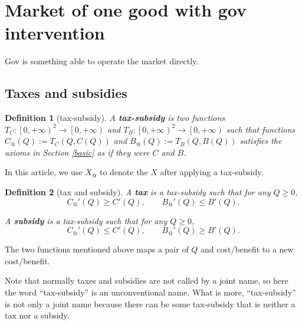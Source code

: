 \documentclass{article}
\newtheorem{definition}{Definition}[subsection]
\begin{document}
\section{Market of one good with gov intervention}

Gov is something able to operate the market directly.

\subsection{Taxes and subsidies}

\begin{definition}[tax-subsidy]
\label{tax-subsidy}
A \textbf{tax-subsidy} is two functions
$T_C:\left[0,+\infty\right)^2\to\left[0,+\infty\right)$ and
$T_B:\left[0,+\infty\right)^2\to\left[0,+\infty\right)$
such that functions $C_@\left(Q\right):=T_C\left(Q,C\left(Q\right)\right)$
and $B_@\left(Q\right):=T_B\left(Q,B\left(Q\right)\right)$
satisfies the axioms in Section \ref{basic} as if they were $C$ and $B$.
\end{definition}

In this article, we use $X_@$ to denote the $X$ after applying a tax-subsidy.

\begin{definition}[tax and subsidy]
\label{tax and subsidy}
A \textbf{tax} is a tax-subsidy such that for any $Q\ge0$,
$$C_@'\left(Q\right)\ge C'\left(Q\right),
\qquad B_@'\left(Q\right)\le B'\left(Q\right).$$

A \textbf{subsidy} is a tax-subsidy such that for any $Q\ge0$,
$$C_@'\left(Q\right)\le C'\left(Q\right),
\qquad B_@'\left(Q\right)\ge B'\left(Q\right).$$
\end{definition}

The two functions mentioned above maps a pair of $Q$ and cost/benefit to a new cost/benefit.

Note that normally taxes and subsidies are not called by a joint name,
so here the word ``tax-subsidy'' is an unconventional name.
What is more, ``tax-subsidy'' is not only a joint name
because there can be some tax-subsidy that is neither a tax nor a subsidy.
\end{document}
